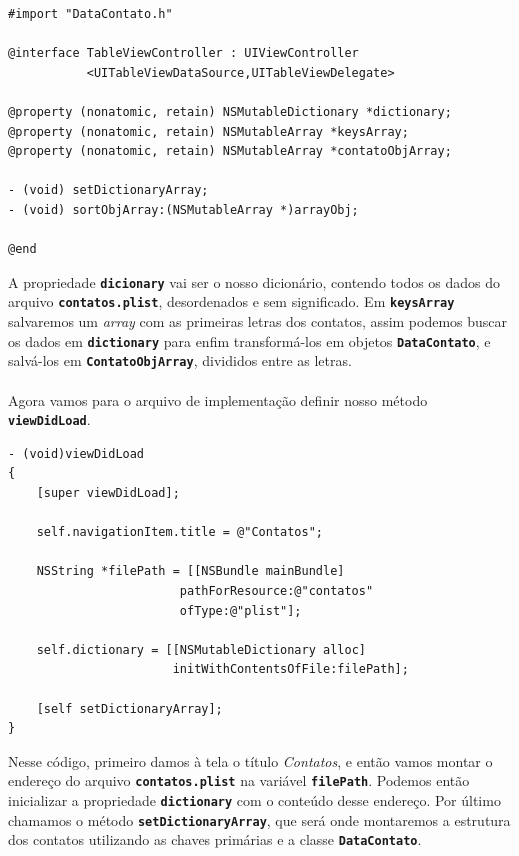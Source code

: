 \documentclass[a4paper,12pt,brazil,doubleside]{book}
\begin{document}
\begin{listing}
\begin{verbatim}
#import "DataContato.h"

@interface TableViewController : UIViewController 
           <UITableViewDataSource,UITableViewDelegate>

@property (nonatomic, retain) NSMutableDictionary *dictionary;
@property (nonatomic, retain) NSMutableArray *keysArray;
@property (nonatomic, retain) NSMutableArray *contatoObjArray;

- (void) setDictionaryArray;
- (void) sortObjArray:(NSMutableArray *)arrayObj;

@end
\end{verbatim}
\end{listing}

A propriedade \texttt{\textbf{dicionary}} vai ser o nosso dicionário, contendo todos os dados do arquivo \texttt{\textbf{contatos.plist}}, desordenados e sem significado. Em \texttt{\textbf{keysArray}} salvaremos um \emph{array} com as primeiras letras dos contatos, assim podemos buscar os dados em \texttt{\textbf{dictionary}} para enfim transformá-los em objetos \texttt{\textbf{DataContato}}, e salvá-los em \texttt{\textbf{ContatoObjArray}}, divididos entre as letras.
\paragraph{}Agora vamos para o arquivo de implementação definir nosso método \texttt{\textbf{viewDidLoad}}.

\pagebreak

\begin{listing}
\begin{verbatim}
- (void)viewDidLoad
{
    [super viewDidLoad];
    
    self.navigationItem.title = @"Contatos";
    
    NSString *filePath = [[NSBundle mainBundle]
    					pathForResource:@"contatos"
    					ofType:@"plist"];
    
    self.dictionary = [[NSMutableDictionary alloc]
    				   initWithContentsOfFile:filePath];
    
    [self setDictionaryArray];
}
\end{verbatim}
\end{listing}

Nesse código, primeiro damos à tela o título \emph{Contatos}, e então vamos montar o endereço do arquivo \texttt{\textbf{contatos.plist}} na variável \texttt{\textbf{filePath}}. Podemos então inicializar a propriedade \texttt{\textbf{dictionary}} com o conteúdo desse endereço. Por último chamamos o método \texttt{\textbf{setDictionaryArray}}, que será onde montaremos a estrutura dos contatos utilizando as chaves primárias e a classe \texttt{\textbf{DataContato}}.
\end{document}
